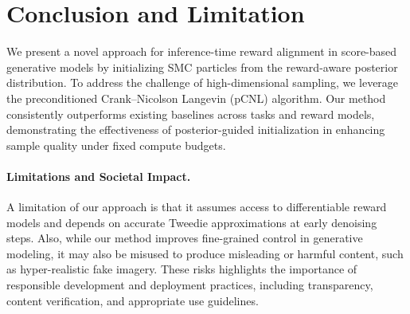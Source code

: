 \vspace{-0.3cm}
\section{Conclusion and Limitation}
\vspace{-0.3cm}
\label{sec:conclusion}
We present a novel approach for inference-time reward alignment in score-based generative models by initializing SMC particles from the reward-aware posterior distribution. To address the challenge of high-dimensional sampling, we leverage the preconditioned Crank–Nicolson Langevin (pCNL) algorithm. Our method consistently outperforms existing baselines across tasks and reward models, demonstrating the effectiveness of posterior-guided initialization in enhancing sample quality under fixed compute budgets.
\vspace{-0.3cm}
\paragraph{Limitations and Societal Impact.} A limitation of our approach is that it assumes access to differentiable reward models and depends on accurate Tweedie approximations at early denoising steps. Also, while our method improves fine-grained control in generative modeling, it may also be misused to produce misleading or harmful content, such as hyper-realistic fake imagery. These risks highlights the importance of responsible development and deployment practices, including transparency, content verification, and appropriate use guidelines.
